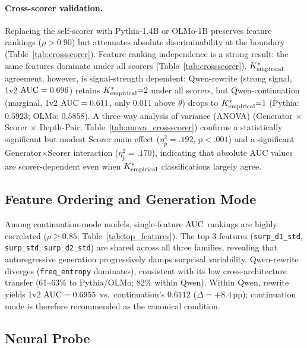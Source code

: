 \paragraph{Cross-scorer validation.}
Replacing the self-scorer with Pythia-1.4B or OLMo-1B preserves feature rankings ($\rho > 0.90$) but attenuates absolute discriminability at the boundary (Table~\ref{tab:crossscorer}).
Feature ranking independence is a strong result: the same features dominate under all scorers (Table~\ref{tab:crossscorer}).
${K^*_{\text{empirical}}}$ agreement, however, is signal-strength dependent: Qwen-rewrite (strong signal, 1v2 $\text{AUC} = 0.696$) retains ${K^*_{\text{empirical}}}{=}2$ under all scorers, but Qwen-continuation (marginal, 1v2 $\text{AUC} = 0.611$, only 0.011 above $\theta$) drops to ${K^*_{\text{empirical}}}{=}1$ (Pythia: $0.5923$; OLMo: $0.5858$).
A three-way analysis of variance (ANOVA) (Generator $\times$ Scorer $\times$ Depth-Pair; Table~\ref{tab:anova_crossscorer}) confirms a statistically significant but modest Scorer main effect ($\eta^2_p{=}.192$, $p < .001$) and a significant Generator$\times$Scorer interaction ($\eta^2_p{=}.170$), indicating that absolute AUC values are scorer-dependent even when ${K^*_{\text{empirical}}}$ classifications largely agree.

\subsection{Feature Ordering and Generation Mode}
\label{sec:feature_degradation}
\label{sec:generation_mode}

Among continuation-mode models, single-feature $\text{AUC}$ rankings are highly correlated ($\rho \geq 0.85$; Table~\ref{tab:top_features}).
The top-3 features (\texttt{surp\_d1\_std}, \texttt{surp\_std}, \texttt{surp\_d2\_std}) are shared across all three families, revealing that autoregressive generation progressively damps surprisal variability.
Qwen-rewrite diverges (\texttt{freq\_entropy} dominates), consistent with its low cross-architecture transfer (61--63\% to Pythia/OLMo; 82\% within Qwen).
Within Qwen, rewrite yields 1v2 $\text{AUC} = 0.6955$ vs.\ continuation's $0.6112$ ($\Delta = +8.4$\,pp); continuation mode is therefore recommended as the canonical condition.

\subsection{Neural Probe}
\label{sec:neural_probe}

